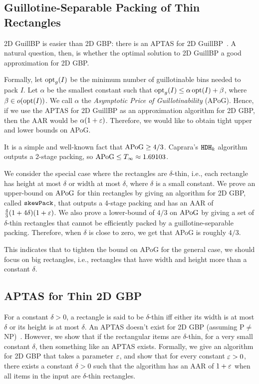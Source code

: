 \subsection{Guillotine-Separable Packing of Thin Rectangles}

2D GuillBP is easier than 2D GBP: there is an APTAS for 2D GuillBP~\cite{bansal2005tale}.
A natural question, then, is whether the optimal solution to 2D GuillBP
a good approximation for 2D GBP.

Formally, let $\operatorname{opt}_g(I)$ be the minimum number of guillotinable bins needed to pack $I$.
Let $\alpha$ be the smallest constant such that
$\operatorname{opt}_g(I) \le \alpha\operatorname{opt}(I) + \beta$, where $\beta \in o(\operatorname{opt}(I))$.
We call $\alpha$ the \emph{Asymptotic Price of Guillotinability} (APoG).
Hence, if we use the APTAS for 2D GuillBP as an approximation algorithm for 2D GBP,
then the AAR would be $\alpha(1 + \varepsilon)$.
Therefore, we would like to obtain tight upper and lower bounds on APoG.

It is a simple and well-known fact that $\mathrm{APoG} \ge 4/3$.
Caprara's $\operatorname{\mathtt{HDH}}_{k}$ algorithm~\cite{caprara2008} outputs a 2-stage packing,
so $\mathrm{APoG} \le T_{\infty} \approx 1.69103$.

We consider the special case where the rectangles are $\delta$-thin,
i.e., each rectangle has height at most $\delta$ or width at most $\delta$,
where $\delta$ is a small constant.
We prove an upper-bound on $\mathrm{APoG}$ for thin rectangles by
giving an algorithm for 2D GBP, called $\operatorname{\mathtt{skewPack}}$,
that outputs a 4-stage packing and has an AAR of $\frac{4}{3}(1+4\delta)(1+\varepsilon)$.
We also prove a lower-bound of $4/3$ on $\mathrm{APoG}$ by giving
a set of $\delta$-thin rectangles that cannot be efficiently
packed by a guillotine-separable packing.
Therefore, when $\delta$ is close to zero, we get that APoG is roughly $4/3$.

This indicates that to tighten the bound on APoG for the general case,
we should focus on big rectangles, i.e., rectangles that have width and height
more than a constant $\delta$.

\subsection{APTAS for Thin 2D GBP}

For a constant $\delta > 0$, a rectangle is said to be $\delta$-thin
iff either its width is at most $\delta$ or its height is at most $\delta$.
An APTAS doesn't exist for 2D GBP (assuming P$\neq$NP)~\cite{bansal2006bin}.
However, we show that if the rectangular items are $\delta$-thin,
for a very small constant $\delta$, then something like an APTAS exists.
Formally, we give an algorithm for 2D GBP that takes a parameter $\varepsilon$,
and show that for every constant $\varepsilon > 0$, there exists a constant $\delta > 0$
such that the algorithm has an AAR of $1+\varepsilon$
when all items in the input are $\delta$-thin rectangles.
